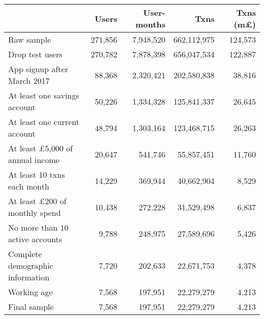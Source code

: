 \begin{tabular}{lrrrr}
\toprule
                                       &   Users & User-months &        Txns & Txns (m\pounds) \\
\midrule
                            Raw sample & 271,856 &   7,948,520 & 662,112,975 &         124,573 \\
                       Drop test users & 270,782 &   7,878,398 & 656,047,534 &         122,887 \\
           App signup after March 2017 &  88,368 &   2,320,421 & 202,580,838 &          38,816 \\
          At least one savings account &  50,226 &   1,334,328 & 125,841,337 &          26,645 \\
          At least one current account &  48,794 &   1,303,164 & 123,468,715 &          26,263 \\
At least \pounds5,000 of annual income &  20,647 &     541,746 &  55,857,451 &          11,760 \\
           At least 10 txns each month &  14,229 &     369,944 &  40,662,904 &           8,529 \\
  At least \pounds200 of monthly spend &  10,438 &     272,228 &  31,529,498 &           6,837 \\
       No more than 10 active accounts &   9,788 &     248,975 &  27,589,696 &           5,426 \\
      Complete demographic information &   7,720 &     202,633 &  22,671,753 &           4,378 \\
                           Working age &   7,568 &     197,951 &  22,279,279 &           4,213 \\
                          Final sample &   7,568 &     197,951 &  22,279,279 &           4,213 \\
\bottomrule
\end{tabular}
